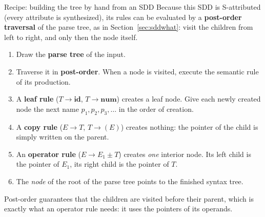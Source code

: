 \documentclass[11pt,a4paper]{article}
\begin{document}
\begin{defbox}{Recipe: building the tree by hand from an SDD}
Because this SDD is S-attributed (every attribute is synthesized), its rules can be evaluated by a \textbf{post-order traversal} of the parse tree, as in Section~\ref{sec:sddwhat}: visit the children from left to right, and only then the node itself.
\begin{enumerate}[nosep]
\item Draw the \textbf{parse tree} of the input.
\item Traverse it in \textbf{post-order}. When a node is visited, execute the semantic rule of its production.
\item A \textbf{leaf rule} ($T\to\mathbf{id}$, $T\to\mathbf{num}$) creates a leaf node. Give each newly created node the next name $p_1, p_2, p_3,\dots$ in the order of creation.
\item A \textbf{copy rule} ($E\to T$, $T\to(E)$) creates nothing: the pointer of the child is simply written on the parent.
\item An \textbf{operator rule} ($E\to E_1\pm T$) creates \emph{one} interior node. Its left child is the pointer of $E_1$, its right child is the pointer of $T$.
\item The \textit{node} of the root of the parse tree points to the finished syntax tree.
\end{enumerate}
Post-order guarantees that the children are visited before their parent, which is exactly what an operator rule needs: it uses the pointers of its operands.
\end{defbox}
\end{document}
